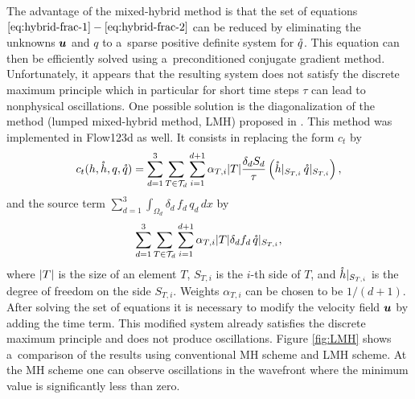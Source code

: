 The advantage of the mixed-hybrid method is that the set of equations $\eqref{eq:hybrid-frac-1} - 
\eqref{eq:hybrid-frac-2}$ can be reduced by eliminating the unknowns $\mathbf{\boldsymbol{u}}$ and $q$
to a~sparse positive definite system for $\mathring q$.
This equation can then be efficiently solved using a~preconditioned conjugate gradient method.
Unfortunately, it appears that the resulting system does not satisfy the discrete maximum principle
 which in particular for short time steps $\tau$ can lead to nonphysical oscillations.
One possible solution is the diagonalization of the method (lumped mixed-hybrid method, LMH)
 proposed in \cite{younes_2006}.
This method was implemented in Flow123d as well.
It consists in replacing the form $c_t$ by
\[
    c_t(h, \mathring h, q, \mathring q)= \sum_{d=1}^{3}\sum_{T\in \mathcal T_d}
        \sum_{i=1}^{d+1} \alpha_{T,i} \lvert T\rvert \frac{\delta_d S_d}{\tau} 
        \left(\mathring h|_{S_{T,i}}\,  \mathring q|_{S_{T,i}}\right),
\]
and the source term $\sum_{d=1}^{3}\int_{\Omega_d} \delta_{d}\,f_d\,q_{d}\,dx$ by
\[
    \sum_{d=1}^{3}\sum_{T\in \mathcal T_d}
        \sum_{i=1}^{d+1} \alpha_{T,i} \lvert T\rvert \delta_d f_d\,
        \mathring q|_{S_{T,i}},
\]
where $\lvert T\rvert$ is the size of an element $T$, $S_{T,i}$ is the $i$-th side of $T$, and 
$\mathring h|_{S_{T,i}}$ is the degree of freedom on the side $S_{T,i}$. 
Weights $\alpha_{T,i}$ can be chosen to be $1/(d+1)$. 
After solving the set of equations it is necessary to modify the velocity field $\mathbf{\boldsymbol{u}}$
 by adding the time term.
This modified system already satisfies the discrete maximum principle
 and does not produce oscillations.
Figure \ref{fig:LMH} shows a~comparison of the results
 using conventional MH scheme and LMH scheme.
At the MH scheme one can observe oscillations in the wavefront
 where the minimum value is significantly less than zero.

